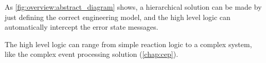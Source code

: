 As \cref{fig:overview:abstract_diagram} shows, a hierarchical solution can be made by just defining the correct engineering model, and the high level logic can automatically intercept the error state messages.

The high level logic can range from simple reaction logic to a complex system, like the complex event processing solution (\vref{chap:cep}).